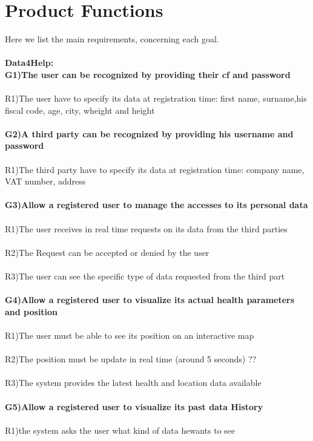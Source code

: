 \section{Product Functions}

Here we list the main requirements, concerning each goal. \\ \\
\textbf{Data4Help:} \\
\textbf{G1)The user can be recognized by providing their cf and password} \\ \\
R1)The user have to specify its data at registration time: first name, surname,his fiscal code, age, city, wheight and height\\ \\
\textbf{G2)A third party can be recognized by providing his username and password} \\ \\
R1)The third party have to specify its data at registration time: company name, VAT number, address\\ \\
\textbf{G3)Allow a registered user to manage the accesses to its personal data} \\ \\
R1)The user receives in real time requests on its data from the third parties \\ \\
R2)The Request can be accepted or denied by the user\\ \\
R3)The user can see the specific type of data requested from the third part \\ \\ 
\textbf{ G4)Allow a registered user to visualize its actual health parameters and position} \\ \\
R1)The user must be able to see its position on an interactive map \\ \\
R2)The position must be update in real time (around 5 seconds) ?? \\ \\
R3)The system provides the latest health and location data available \\ \\
\textbf{G5)Allow a registered user to visualize its past data History} \\ \\
R1)the system asks the user what kind of data he\she wants to see \\ \\
